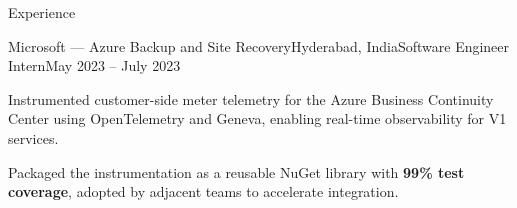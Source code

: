 \begin{rSection}{Experience}
    \begin{rSubsection}{Microsoft --- Azure Backup and Site Recovery}{Hyderabad, India}{Software Engineer Intern}{May 2023 -- July 2023}
        \item Instrumented customer-side meter telemetry for the Azure Business Continuity Center using OpenTelemetry and Geneva, enabling real-time observability for V1 services.
        \item Packaged the instrumentation as a reusable NuGet library with \textbf{99\% test coverage}, adopted by adjacent teams to accelerate integration.
    \end{rSubsection}

\end{rSection}
